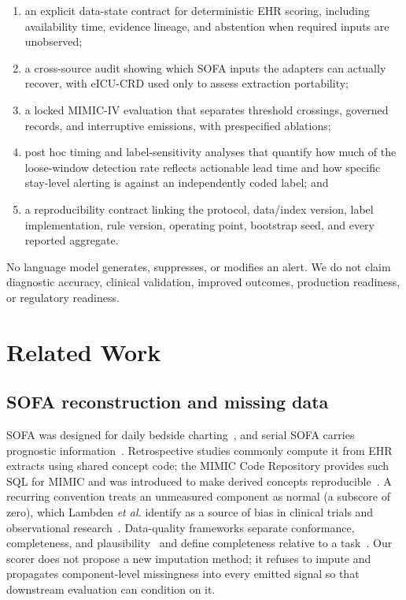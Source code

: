 \documentclass[journal]{IEEEtran}
\begin{document}
\begin{enumerate}
\item an explicit data-state contract for deterministic EHR scoring, including
availability time, evidence lineage, and abstention when required inputs are
unobserved;
\item a cross-source audit showing which SOFA inputs the adapters can actually
recover, with eICU-CRD used only to assess extraction portability;
\item a locked MIMIC-IV evaluation that separates threshold crossings,
governed records, and interruptive emissions, with prespecified ablations;
\item post hoc timing and label-sensitivity analyses that quantify how much of
the loose-window detection rate reflects actionable lead time and how
specific stay-level alerting is against an independently coded label; and
\item a reproducibility contract linking the protocol, data/index version,
label implementation, rule version, operating point, bootstrap seed, and
every reported aggregate.
\end{enumerate}

No language model generates, suppresses, or modifies an alert. We do not
claim diagnostic accuracy, clinical validation, improved outcomes,
production readiness, or regulatory readiness.

\section{Related Work}

\subsection{SOFA reconstruction and missing data}
SOFA was designed for daily bedside charting~\cite{vincent1996sofa}, and serial
SOFA carries prognostic information~\cite{ferreira2001}. Retrospective
studies commonly compute it from EHR extracts using shared concept code; the
MIMIC Code Repository provides such SQL for MIMIC and was introduced to make
derived concepts reproducible~\cite{johnson2018code}. A recurring convention
treats an unmeasured component as normal (a subscore of zero), which Lambden
\emph{et al.} identify as a source of bias in clinical trials and
observational research~\cite{lambden2019}. Data-quality frameworks separate
conformance, completeness, and plausibility~\cite{kahn2016} and define
completeness relative to a task~\cite{weiskopf2013}. Our scorer does not
propose a new imputation method; it refuses to impute and propagates
component-level missingness into every emitted signal so that downstream
evaluation can condition on it.
\end{document}
